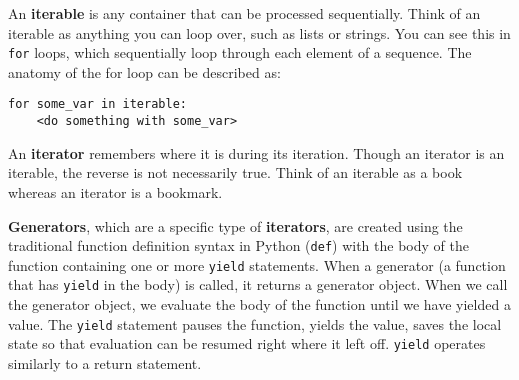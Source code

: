 An \textbf{iterable} is any container that can be processed sequentially. Think of an iterable as anything you can loop over, such as lists or strings.  You can see this in \lstinline{for} loops, which sequentially loop through each element of a sequence. The anatomy of the for loop can be described as:
\begin{lstlisting}
for some_var in iterable:
    <do something with some_var>
\end{lstlisting}
An \textbf{iterator} remembers where it is during its iteration. Though an iterator is an iterable, the reverse is not necessarily true. Think of an iterable as a book whereas an iterator is a bookmark.

\textbf{Generators}, which are a specific type of \textbf{iterators}, are created using the traditional function definition syntax in Python (\lstinline{def}) with the body of the function containing one or more \lstinline{yield} statements. When a generator (a function that has \lstinline{yield} in the body) is called, it returns a generator object. When we call the generator object, we evaluate the body of the function until we have yielded a value. The \lstinline{yield} statement pauses the function, yields the value, saves the local state so that evaluation can be resumed right where it left off.  \lstinline{yield} operates similarly to a return statement.